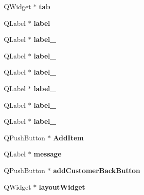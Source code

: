\begin{DoxyCompactItemize}
Q\+Widget $\ast$ {\bfseries tab}
\item 
\mbox{\label{class_ui___main_window_ad9c89133780f28e6efa2ec17ceb9cff5}} 
Q\+Label $\ast$ {\bfseries label}
\item 
\mbox{\label{class_ui___main_window_a2e2516d755e4dd53fc905dabddf2738a}} 
Q\+Label $\ast$ {\bfseries label\+\_}
\item 
\mbox{\label{class_ui___main_window_a0376fd90247280e7c7957cc70628708c}} 
Q\+Label $\ast$ {\bfseries label\+\_}
\item 
\mbox{\label{class_ui___main_window_a78c7e10730b43c6700cd7216911ed76a}} 
Q\+Label $\ast$ {\bfseries label\+\_}
\item 
\mbox{\label{class_ui___main_window_ad6bab8fb8903b8f41afea1218ee52695}} 
Q\+Label $\ast$ {\bfseries label\+\_}
\item 
\mbox{\label{class_ui___main_window_a663f728e6244926a795c6e6892673b1d}} 
Q\+Label $\ast$ {\bfseries label\+\_}
\item 
\mbox{\label{class_ui___main_window_a13936e6f18b1c90402b3c7a3c92b6cdb}} 
Q\+Label $\ast$ {\bfseries label\+\_}
\item 
\mbox{\label{class_ui___main_window_a04efde2b4f8cac79a380cba2c283e541}} 
Q\+Push\+Button $\ast$ {\bfseries Add\+Item}
\item 
\mbox{\label{class_ui___main_window_a7ab36d2e9d2017b4b5664383a1a75104}} 
Q\+Label $\ast$ {\bfseries message}
\item 
\mbox{\label{class_ui___main_window_a88eb019735d0c675c82d92a7fe20db74}} 
Q\+Push\+Button $\ast$ {\bfseries add\+Customer\+Back\+Button}
\item 
\mbox{\label{class_ui___main_window_ab96ab0f0578098521fa69a75aa5cdde8}} 
Q\+Widget $\ast$ {\bfseries layout\+Widget}
\item 

\end{DoxyCompactItemize}
